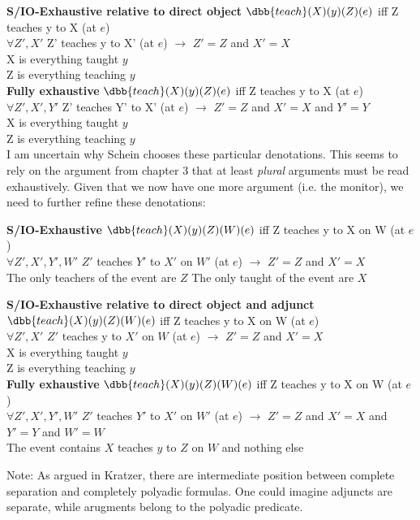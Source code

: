 \pex \textbf{S/IO-Exhaustive relative to direct object}
\a 
$\dbb{teach}(X)(y)(Z)(e)$ iff Z teaches y to X (at $e$)\\
$\forall Z', X'$ Z' teaches y to X' (at $e$) $\rightarrow$ $Z'=Z$ and $X'=X$\\
\a 
X is everything taught $y$\\
Z is everything teaching $y$\\
\xe
%
\pex \textbf{Fully exhaustive}
\a 
$\dbb{teach}(X)(y)(Z)(e)$ iff Z teaches y to X (at $e$)\\
$\forall Z', X', Y'$ Z' teaches Y' to X' (at $e$) $\rightarrow$ $Z'=Z$ and $X'=X$ and $Y'=Y$\\
\a 
X is everything taught $y$\\
Z is everything teaching $y$\\
\xe
%
I am uncertain why Schein chooses these particular denotations. This seems to rely on the argument from chapter 3 that at least \emph{plural} arguments must be read exhaustively. Given that we now have one more argument (i.e. the monitor), we need to further refine these denotations:

\pex \textbf{S/IO-Exhaustive}
\a 
$\dbb{teach}(X)(y)(Z)(W)(e)$ iff Z teaches y to X on W (at $e$)\\
$\forall Z', X', Y', W'$ $Z'$ teaches $Y'$ to $X'$ on $W'$ (at $e$) $\rightarrow$ $Z'=Z$ and $X'=X$\\
\a 
The only teachers of the event are $Z$
The only taught of the event are $X$
\xe
%

\pex \textbf{S/IO-Exhaustive relative to direct object and adjunct}
\a 
$\dbb{teach}(X)(y)(Z)(W)(e)$ iff Z teaches y to X on W (at $e$)\\
$\forall Z', X'$ $Z'$ teaches y to $X'$ on $W$ (at $e$) $\rightarrow$ $Z'=Z$ and $X'=X$\\
\a 
X is everything taught $y$\\
Z is everything teaching $y$\\
\xe
%
\pex \textbf{Fully exhaustive}
\a 
$\dbb{teach}(X)(y)(Z)(W)(e)$ iff Z teaches y to X on W (at $e$)\\
$\forall Z', X', Y', W'$ $Z'$ teaches $Y'$ to $X'$ on $W'$ (at $e$) $\rightarrow$ $Z'=Z$ and $X'=X$ and $Y'=Y$ and $W' = W$\\
\a 
The event contains $X$ teaches $y$ to $Z$ on $W$ and nothing else
\xe
%


Note: As argued in Kratzer, there are intermediate position between complete separation and completely polyadic formulas. One could imagine adjuncts are separate, while arugments belong to the polyadic predicate.


